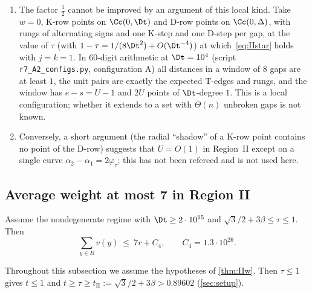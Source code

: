 \begin{remark}\label{rem:IIsharp}
\begin{enumerate}[leftmargin=2em,label=(\alph*)]
\item The factor $\frac12$ cannot be improved by an argument of this local kind. Take $w=0$, K-row points on $\Cc(0,\Dt)$ and D-row points on $\Cc(0,\Delta)$, with rungs of alternating signs and one K-step and one D-step per gap, at the value of $\tau$ (with $1-\tau=1/(8\Dt^2)+O(\Dt^{-4})$) at which~\eqref{eq:IIstar} holds with $j=k=1$. In $60$-digit arithmetic at $\Dt=10^4$ (script \texttt{r7\_A2\_configs.py}, configuration A) all distances in a window of $8$ gaps are at least $1$, the unit pairs are exactly the expected T-edges and rungs, and the window has $e-s=U-1$ and $2U$ points of $\Dt$-degree $1$. This is a local configuration; whether it extends to a set with $\Theta(n)$ unbroken gaps is not known.
\item Conversely, a short argument (the radial ``shadow'' of a K-row point contains no point of the D-row) suggests that $U=O(1)$ in Region~II except on a single curve $\alpha_2-\alpha_1=2\varphi_\tau$; this has not been refereed and is not used here.
\end{enumerate}
\end{remark}

\subsection{Average weight at most 7 in Region II}\label{sec:IIw}

\begin{theorem}\label{thm:IIw}
Assume the nondegenerate regime with $\Dt\ge2\cdot10^{15}$ and $\sqrt3/2+3\beta\le\tau\le1$. Then
\[
\sum_{y\in R}v(y)\ \le\ 7r+C_4,\qquad C_4=1.3\cdot10^{26}.
\]
\end{theorem}

Throughout this subsection we assume the hypotheses of \cref{thm:IIw}. Then $\tau\le1$ gives $t\le1$ and $t\ge\tau\ge t_{\mathrm{II}}:=\sqrt3/2+3\beta>0.89602$ (\cref{sec:setup}).

